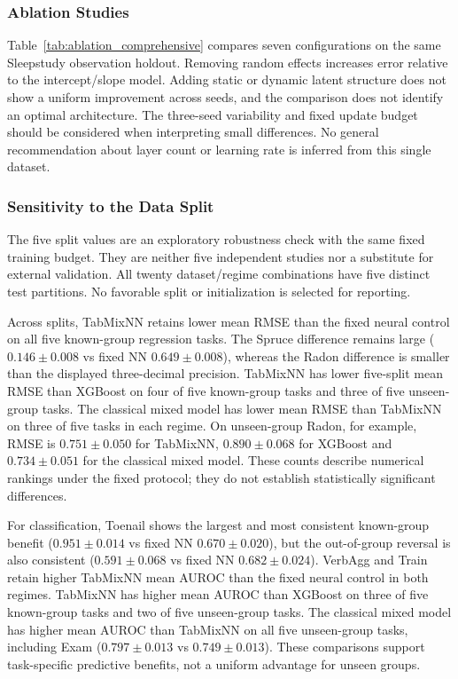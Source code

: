\subsubsection{Ablation Studies}
Table~\ref{tab:ablation_comprehensive} compares seven configurations on the same Sleepstudy observation holdout. Removing random effects increases error relative to the intercept/slope model. Adding static or dynamic latent structure does not show a uniform improvement across seeds, and the comparison does not identify an optimal architecture. The three-seed variability and fixed update budget should be considered when interpreting small differences. No general recommendation about layer count or learning rate is inferred from this single dataset.


\FloatBarrier

\subsubsection{Sensitivity to the Data Split}
The five split values are an exploratory robustness check with the same fixed
training budget. They are neither five independent studies nor a substitute
for external validation. All twenty dataset/regime combinations have five
distinct test partitions. No favorable
split or initialization is selected for reporting.


\FloatBarrier

\FloatBarrier

Across splits, TabMixNN retains lower mean RMSE than the fixed neural control
on all five known-group regression tasks. The Spruce difference remains large
($0.146 \pm 0.008$ vs fixed NN $0.649 \pm 0.008$), whereas the Radon
difference is smaller than the displayed three-decimal precision.
TabMixNN has lower five-split mean RMSE than XGBoost on four of five
known-group tasks and three of five unseen-group tasks. The classical mixed
model has lower mean RMSE than TabMixNN on three of five tasks in each regime.
On unseen-group Radon, for example, RMSE is $0.751 \pm 0.050$ for
TabMixNN, $0.890 \pm 0.068$ for XGBoost and $0.734 \pm 0.051$ for the
classical mixed model. These counts describe numerical rankings under the
fixed protocol; they do not establish statistically significant differences.

For classification, Toenail shows the largest and most consistent known-group
benefit ($0.951 \pm 0.014$ vs fixed NN $0.670 \pm 0.020$), but the
out-of-group reversal is also consistent ($0.591 \pm 0.068$ vs fixed NN
$0.682 \pm 0.024$). VerbAgg and Train retain higher TabMixNN mean AUROC
than the fixed neural control in both regimes.
TabMixNN has higher mean AUROC than XGBoost on three of five known-group
tasks and two of five unseen-group tasks. The classical mixed model has
higher mean AUROC than TabMixNN on all five unseen-group tasks, including
Exam ($0.797 \pm 0.013$ vs $0.749 \pm 0.013$). These comparisons
support task-specific predictive benefits, not a uniform advantage for unseen
groups.

